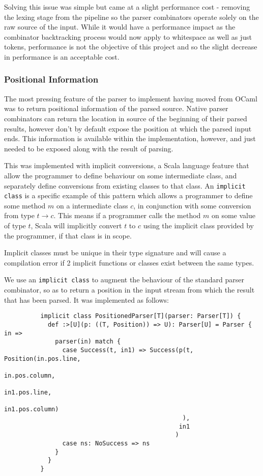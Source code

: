 \documentclass[british, twoside]{bhamthesis}
\theoremstyle{definition}
\begin{document}
        Solving this issue was simple but came at a slight performance cost - removing the lexing stage from the pipeline so the parser combinators operate solely on the raw source of the input. While it would have a performance impact as the combinator backtracking process would now apply to whitespace as well as just tokens, performance is not the objective of this project and so the slight decrease in performance is an acceptable cost.

      \subsubsection{Positional Information}
        The most pressing feature of the parser to implement having moved from OCaml was to return positional information of the parsed source. Native parser combinators can return the location in source of the beginning of their parsed results, however don't by default expose the position at which the parsed input ends. This information is available within the implementation, however, and just needed to be exposed along with the result of parsing.

         This was implemented with implicit conversions, a Scala language feature that allow the programmer to define behaviour on some intermediate class, and separately define conversions from existing classes to that class. An \texttt{implicit class} is a specific example of this pattern which allows a programmer to define some method $m$ on a intermediate class $c$, in conjunction with some conversion from type $t\rightarrow c$. This means if a programmer calls the method $m$ on some value of type $t$, Scala will implicitly convert $t$ to $c$ using the implicit class provided by the programmer, if that class is in scope.

        Implicit classes must be unique in their type signature and will cause a compilation error if 2 implicit functions or classes exist between the same types.

        We use an \texttt{implicit class} to augment the behaviour of the standard parser combinator, so as to return a position in the input stream from which the result that has been parsed. It was implemented as follows:

        \begin{lstlisting}
          implicit class PositionedParser[T](parser: Parser[T]) {
            def :>[U](p: ((T, Position)) => U): Parser[U] = Parser { in =>
              parser(in) match {
                case Success(t, in1) => Success(p(t, Position(in.pos.line,
                                                              in.pos.column,
                                                              in1.pos.line,
                                                              in1.pos.column)
                                                 ),
                                                in1
                                               )
                case ns: NoSuccess => ns
              }
            }
          }
        \end{lstlisting}
\end{document}
